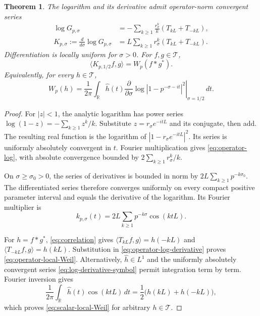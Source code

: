 \documentclass[11pt,letterpaper]{article}
\newtheorem{theorem}{Theorem}[section]
\theoremstyle{definition}
\theoremstyle{remark}
\newcommand{\R}{\mathbb R}
\newcommand{\T}{\mathcal T}
\begin{document}
\begin{theorem}\label{thm:local-correspondence:logarithmic}
The logarithm and its derivative admit operator-norm convergent series
\begin{align}
 \log G_{p,\sigma}
 &=-\sum_{k\ge1}\frac{r_\sigma^k}{k}
                (T_{kL}+T_{-kL}),\label{eq:operator-log}\\
 K_{p,\sigma}:=\frac{d}{d\sigma}\log G_{p,\sigma}
 &=L\sum_{k\ge1}r_\sigma^k(T_{kL}+T_{-kL}).
 \label{eq:operator-log-derivative}
\end{align}
Differentiation is locally uniform for $\sigma>0$. For $f,g\in\T$,
\begin{equation}\label{eq:operator-local-Weil}
 \langle K_{p,1/2}f,g\rangle=W_p(f*g^*).
\end{equation}
Equivalently, for every $h\in\T$,
\begin{equation}\label{eq:scalar-local-Weil}
 W_p(h)=\frac1{2\pi}\int_\R\widehat h(t)
 \left.\frac{\partial}{\partial\sigma}
       \log|1-p^{-\sigma-it}|^2\right|_{\sigma=1/2}\,dt.
\end{equation}
\end{theorem}

\begin{proof}
For $|z|<1$, the analytic logarithm has power series
$\log(1-z)=-\sum_{k\ge1}z^k/k$. Substitute
$z=r_\sigma e^{-itL}$ and its conjugate, then add. The resulting
real function is the logarithm of
$|1-r_\sigma e^{-itL}|^2$. Its series is uniformly absolutely
convergent in $t$. Fourier multiplication gives
\eqref{eq:operator-log}, with absolute convergence bounded by
$2\sum_{k\ge1}r_\sigma^k/k$.

On $\sigma\ge\sigma_0>0$, the series of derivatives is bounded
in norm by $2L\sum_{k\ge1}p^{-k\sigma_0}$. The differentiated
series therefore converges uniformly on every compact positive
parameter interval and equals the derivative of the logarithm.
Its Fourier multiplier is
\begin{equation}\label{eq:log-derivative-symbol}
 k_{p,\sigma}(t)=2L\sum_{k\ge1}p^{-k\sigma}\cos(ktL).
\end{equation}

For $h=f*g^*$, \eqref{eq:correlation} gives
$\langle T_{kL}f,g\rangle=h(-kL)$ and
$\langle T_{-kL}f,g\rangle=h(kL)$. Substitution in
\eqref{eq:operator-log-derivative} proves
\eqref{eq:operator-local-Weil}. Alternatively,
$\widehat h\in L^1$ and the uniformly absolutely convergent
series \eqref{eq:log-derivative-symbol} permit integration term by
term. Fourier inversion gives
\begin{equation}\label{eq:cosine-inversion}
 \frac1{2\pi}\int_\R\widehat h(t)\cos(ktL)\,dt
     =\frac12\bigl(h(kL)+h(-kL)\bigr),
\end{equation}
which proves \eqref{eq:scalar-local-Weil} for arbitrary $h\in\T$.
\end{proof}
\end{document}
